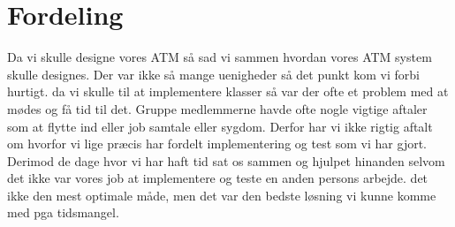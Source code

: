 \section{Fordeling}
Da vi skulle designe vores ATM så sad vi sammen hvordan vores ATM system skulle designes. Der var ikke så mange uenigheder så det punkt kom vi forbi hurtigt. da vi skulle til at implementere klasser så var der ofte et problem med at mødes og få tid til det. Gruppe medlemmerne havde ofte nogle vigtige aftaler som at flytte ind eller job samtale eller sygdom. Derfor har vi ikke rigtig aftalt om hvorfor vi lige præcis har fordelt implementering og test som vi har gjort. Derimod de dage hvor vi har haft tid sat os sammen og hjulpet hinanden selvom det ikke var vores job at implementere og teste en anden persons arbejde. det ikke den mest optimale måde, men det var den bedste løsning vi kunne komme med pga tidsmangel. 